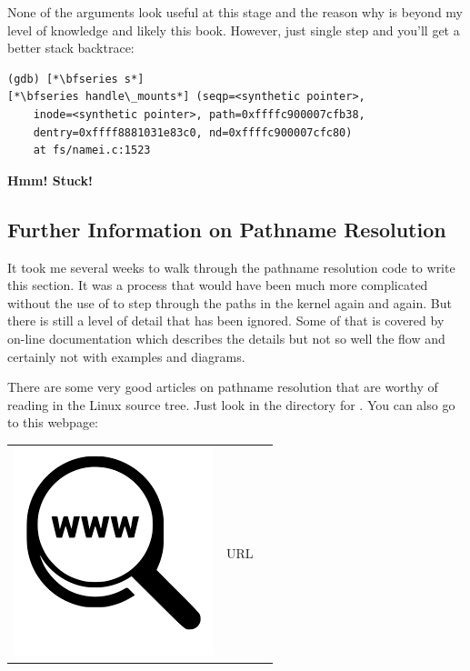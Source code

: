 \noindent
None of the arguments look useful at this stage and the reason why is beyond my level of  knowledge and likely this book. However, just single step and you'll get a better stack backtrace:

\begin{lstlisting}
(gdb) [*\bfseries s*]
[*\bfseries handle\_mounts*] (seqp=<synthetic pointer>, 
    inode=<synthetic pointer>, path=0xffffc900007cfb38, 
    dentry=0xffff8881031e83c0, nd=0xffffc900007cfc80) 
    at fs/namei.c:1523
\end{lstlisting}

\noindent
\textbf{Hmm! Stuck!}


\subsection{Further Information on Pathname Resolution}

It took me several weeks to walk through the pathname resolution code to write this section. It was a process that would have been much more complicated without the use of  to step through the paths in the kernel again and again. But there is still a level of detail that has been ignored. Some of that is covered by on-line documentation which describes the details but not so well the flow and certainly not with examples and diagrams.

There are some very good articles on pathname resolution that are worthy of reading  in the Linux source tree. Just look in the  directory for . You can also go to this webpage:

\begin{table}[h]
\begin{tabular}{lcl}
\parbox[r]{0.5in}{\includegraphics[scale=0.15]{figures/url.png}} & \parbox[l]{0.55in}{URL } & \parbox[l]{3in}{}
\end{tabular}
\end{table}

